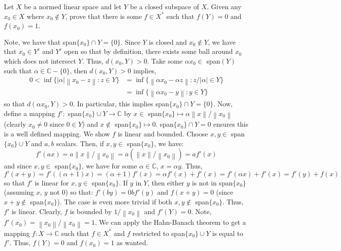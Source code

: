 \documentclass{article}
\newcommand{\norm}[1]{\left\lVert#1\right\rVert}
\begin{document}
    \begin{Exercise}
        Let $X$ be a normed linear space and let $Y$ be a closed subspace of $X$. Given any $x_0\in X$ where $x_0\not\in Y$, prove that there is
        some $f\in X^*$ such that $f(Y) = 0$ and $f(x_0) = 1$.
    \end{Exercise}
    \begin{Answer}
        Note, we have that span$\{x_0\}\cap Y = \{0\}$. Since $Y$ is closed and $x_0\not\in Y$, we have that $x_0\in Y^c$ and $Y^c$ open so that
        by definition, there exists some ball around $x_0$ which does not intersect $Y$. Thus, $d(x_0,Y)>0$. Take some $\alpha x_0\in$ span$(Y)$
        such that $\alpha\in\mathbb{C}-\{0\}$, then $d(x_0,Y)>0$ implies,
        \begin{align*}
            0 < \inf\{|\alpha|\norm{x_0-z}: z\in Y\} &= \inf\{\norm{\alpha x_0 - \alpha z}:z/|\alpha|\in Y\} \\
                &= \inf\{\norm{\alpha x_0 - y}:y\in Y\}
        \end{align*}
        so that $d(\alpha x_0, Y)>0$. In particular, this implies span$\{x_0\}\cap Y = \{0\}$. Now, define a mapping 
        $f':$ span$\{x_0\}\cup Y\to \mathbb{C}$ by $x\in$ span$\{x_0\} \mapsto \alpha\norm{x}/\norm{x_0}$ (clearly $x_0\neq 0$ since $0\in Y$)
        and $x\not\in$ span$\{x_0\}\mapsto 0$. span$\{x_0\}\cap Y=0$ ensures this is a well defined mapping. We show $f$ is linear
        and bounded. Choose $x,y\in$ span$\{x_0\}\cup Y$ and $a,b$ scalars. Then, if $x,y\in$ span$\{x_0\}$, we have:
        \[ f'(ax) = a\norm{x}/\norm{x_0} = a(\norm{x}/\norm{x_0}) = af'(x) \]
        and since $x,y\in$ span$\{x_0\}$, we have for some $\alpha\in\mathbb{C}$, $x = \alpha y$. Thus, 
        \[ f'(x+y) = f'((\alpha+1)x) = (\alpha+1)f'(x) = \alpha f'(x) + f'(x) = f'(\alpha x) + f'(x) = f'(y) + f(x) \]
        so that $f'$ is linear for $x,y\in$ span$\{x_0\}$. If $y$ in $Y$, then either $y$ is not in span$\{x_0\}$ (assuming $x$, $y$ not 0) so that:
        $f'(by) = 0 bf'(y)$ and $f(x+y) = 0$ (since $x+y\not\in$ span$\{x_0\}$). The case is even more trivial if both $x,y\not\in$ span$\{x_0\}$. Thus,
        $f'$ is linear. Clearly, $f$ is bounded by $1/\norm{x_0}$ and $f'(Y) = 0$. Note, $f'(x_0) = \norm{x_0}/\norm{x_0} = 1$. We
        can apply the Hahn-Banach theorem to get a mapping $f:X\to\mathbb{C}$ such that $f\in X^*$ and $f$ restricted to 
        span$\{x_0\}\cup Y$ is equal to $f'$. Thus, $f(Y) = 0$ and $f(x_0) = 1$ as wanted.
    \end{Answer}
\end{document}
